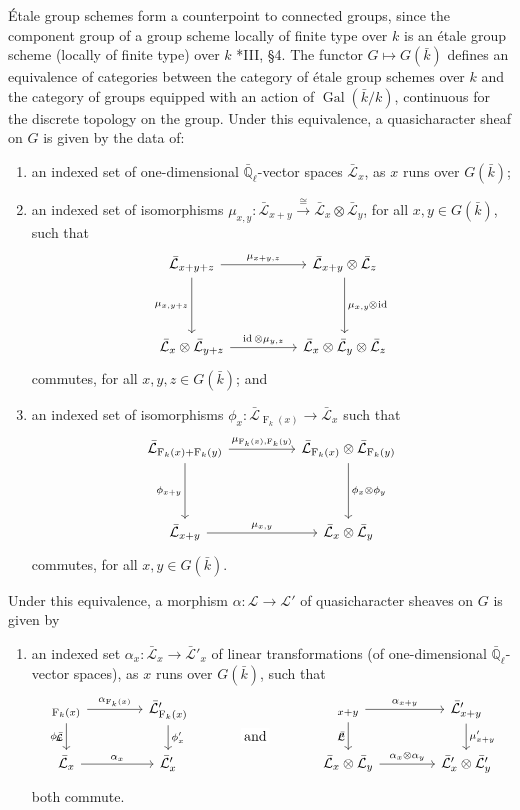\documentclass[11pt]{amsart}
\makeatletter
\theoremstyle{plain}
\theoremstyle{definition}
\theoremstyle{remark}
\newcommand{\EE}{\mathbb{\bar Q}_\ell}
\newcommand{\bFq}{\bar{k}}
\newcommand{\Fq}{k}
\DeclareMathOperator{\Gal}{Gal}
\newcommand{\Frob}[1]{\operatorname{F}_{#1}}
\DeclareMathOperator{\id}{id}
\newcommand{\iso}{{\ \cong\ }}
\newcommand{\cs}[1]{{\mathcal{#1}}}
\newcommand{\gcs}[1]{{\mathcal{\bar #1}}}
\newcommand{\labitem}[2]{%
\def\@itemlabel{\textbf{#1}}
\item
\def\@currentlabel{#1}\label{#2}}
\newcommand{\tight}[3]{\hspace{-#1pt}{#2}\hspace{-#3pt}}
\makeatother
\begin{document}
\'Etale group schemes form a counterpoint to connected groups, since the component group of a group scheme locally of finite type over $\Fq$ is an \'etale group scheme (locally of finite type) over $\Fq$ \cite{vdG&M}*{III, \S 4}.  The functor $G \mapsto G(\bFq)$ defines an equivalence of categories
between the category of \'etale group schemes over $\Fq$ and the category of groups equipped
with an action of $\Gal(\bFq/\Fq)$, continuous for the discrete topology on the group.
Under this equivalence, a quasicharacter sheaf on $G$ is given by the data of:
\begin{enumerate}
 \labitem{(cs.0)}{cs.0} an indexed set of one-dimensional
  $\EE$-vector spaces $\gcs{L}_x$, as $x$ runs over
  $G(\bFq)$;

 \labitem{(cs.1)}{cs.1} an indexed set of isomorphisms
  $\mu_{x,y} : \gcs{L}_{x+y} \mathop{\longrightarrow}\limits^{\iso} \gcs{L}_{x} \otimes \gcs{L}_{y}$,
  for all $x,y \in G(\bFq)$, such that
  \[
   \begin{tikzcd}[row sep=40]
    \gcs{L}_{x+y+z} \arrow{rr}{\mu_{x+y,z}} \arrow[swap]{d}{\mu_{x,y+z}}
    && \gcs{L}_{x+y}\otimes \gcs{L}_{z} \dar{\mu_{x,y} \tight{0.5}{\otimes}{1} \id} \\
    \gcs{L}_{x} \otimes \gcs{L}_{y+z} \arrow{rr}{\id \otimes \mu_{y,z}}
    && \gcs{L}_{x} \otimes\gcs{L}_{y} \otimes \gcs{L}_{z}
   \end{tikzcd}
  \]
  commutes, for all $x,y,z\in G(\bFq)$; and

 \labitem{(cs.2)}{cs.2} an indexed set of isomorphisms $\phi_{x} : \gcs{L}_{\Frob{\Fq}(x)} \to \gcs{L}_x$
  such that
  \[
   \begin{tikzcd}[row sep=40]
    \gcs{L}_{\Frob{\Fq}(x)+\Frob{\Fq}(y)} \arrow[swap]{d}{\phi_{x+y}} \arrow{rr}{\mu_{\Frob{\Fq}(x),\Frob{\Fq}(y)}}
    && \gcs{L}_{\Frob{\Fq}(x)}\otimes \gcs{L}_{\Frob{\Fq}(y)} \dar{\phi_x \tight{0}{\otimes}{0} \phi_y} \\
    \gcs{L}_{x+y} \arrow{rr}{\mu_{x,y}}
    && \gcs{L}_x \otimes\gcs{L}_y
   \end{tikzcd}
  \]
  commutes, for all $x,y\in G(\bFq)$.
\end{enumerate}
Under this equivalence, a morphism $\alpha : \cs{L} \to \cs{L'}$ of quasicharacter sheaves on $G$ is given by 
\begin{enumerate}
 \labitem{(cs.3)}{cs.3} an indexed set $\alpha_x : \gcs{L}_x \to \gcs{L'}_x$
  of linear transformations (of one-dimensional $\EE$-vector spaces),
  as $x$ runs over $G(\bFq)$, such that
  \[
   \begin{tikzcd}[column sep=40]
    \arrow[swap]{d}{\phi_x} \gcs{L}_{\Frob{\Fq}(x)} \rar{\alpha_{\Frob{\Fq}(x)}} & \gcs{L'}_{\Frob{\Fq}(x)} \dar{\phi_x'}
    &\arrow[draw=none]{d}[pos=.4,description]{\text{\normalsize{and}}}& \arrow[swap]{d}{\mu} \gcs{L}_{x+y} \rar{\alpha_{x+y}} & \gcs{L'}_{x+y} \dar{\mu'_{x+y}} \\
    \gcs{L}_x \rar{\alpha_x} & \gcs{L'}_x
    & {} & \gcs{L}_x\otimes\gcs{L}_y \rar{\alpha_x\otimes \alpha_y} & \gcs{L'}_x \otimes \gcs{L'}_y
   \end{tikzcd}
  \]
  both commute.
\end{enumerate}
\end{document}
